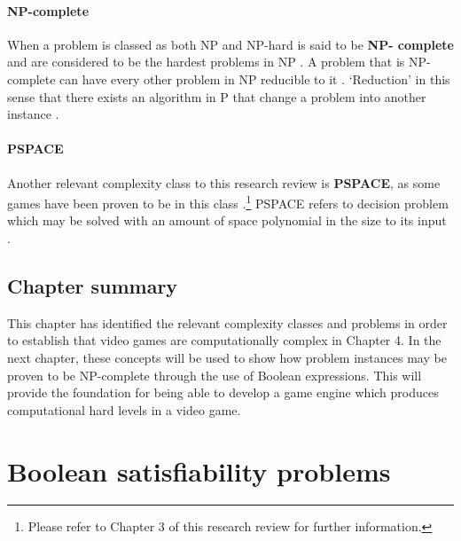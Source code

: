 \documentclass[11pt, a4paper, oneside]{report} %
\begin{document}
\subsubsection{NP-complete}

When a problem is classed as both NP and NP-hard is said to be \textbf{NP-
complete} and are considered to be the hardest problems in NP
\cite{sipser2012introduction,Goldreich:2008,kendall2008survey,du2011theory}. A
problem that is NP- complete can have every other problem in NP reducible to it
\cite{papadimitriou2003computational}. `Reduction' in this sense that there
exists an algorithm in P that change a problem into another instance
\cite{du2011theory}.

\subsubsection{PSPACE}

Another relevant complexity class to this research review is \textbf{PSPACE}, as
some games have been proven to be in this class \cite{DBLP:conf/fun/Forisek10,
demaine2002push}.\footnote{Please refer to Chapter 3 of this research review for
further information.} PSPACE refers to decision problem which may be solved with
an amount of space polynomial in the size to its input
\cite{sipser2012introduction}.

\section{Chapter summary}

This chapter has identified the relevant complexity classes and problems in
order to establish that video games are computationally complex in Chapter 4. In
the next chapter, these concepts will be used to show how problem instances may
be proven to be NP-complete through the use of Boolean expressions. This will
provide the foundation for being able to develop a game engine which produces
computational hard levels in a video game.



\chapter{Boolean satisfiability problems}
\end{document}
